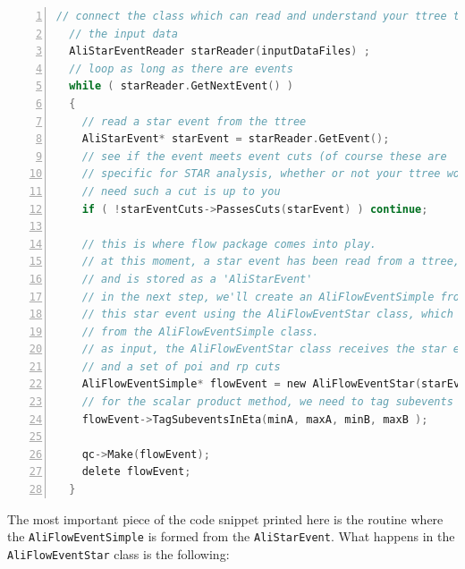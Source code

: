 \documentclass[a4paper]{book}
\numberwithin{equation}{subsection}
\begin{document}
\begin{lstlisting}[language=C, numbers=left]
  // connect the class which can read and understand your ttree to
  // the input data
  AliStarEventReader starReader(inputDataFiles) ;
  // loop as long as there are events
  while ( starReader.GetNextEvent() )                                // Get next event
  {
    // read a star event from the ttree
    AliStarEvent* starEvent = starReader.GetEvent();
    // see if the event meets event cuts (of course these are 
    // specific for STAR analysis, whether or not your ttree would
    // need such a cut is up to you
    if ( !starEventCuts->PassesCuts(starEvent) ) continue;

    // this is where flow package comes into play. 
    // at this moment, a star event has been read from a ttree, 
    // and is stored as a 'AliStarEvent'
    // in the next step, we'll create an AliFlowEventSimple from 
    // this star event using the AliFlowEventStar class, which is derived
    // from the AliFlowEventSimple class. 
    // as input, the AliFlowEventStar class receives the star event,
    // and a set of poi and rp cuts
    AliFlowEventSimple* flowEvent = new AliFlowEventStar(starEvent,rpCuts,poiCuts);  // make a flow event from a star event (aka "the magic")
    // for the scalar product method, we need to tag subevents
    flowEvent->TagSubeventsInEta(minA, maxA, minB, maxB );

    qc->Make(flowEvent);
    delete flowEvent;
  }\end{lstlisting}
The most important piece of the code snippet printed here is the routine where the \texttt{AliFlowEventSimple} is formed from the \texttt{AliStarEvent}. What happens in the  \texttt{AliFlowEventStar} class is the following:
\end{document}
